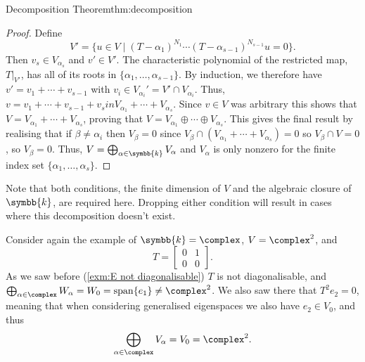 \documentclass[fleqn]{NotesClass}
\renewcommand{\field}{\symbb{k}}
\DeclareMathOperator{\Span}{span}
\begin{document}
\begin{thm}{Decomposition Theorem}{thm:decomposition}
\begin{proof}
            Define
            \begin{equation}
                V' = \{u \in V \mid (T - \alpha_1)^{N_1} \dotsm (T - \alpha_{s-1})^{N_{s-1}}u = 0\}.
            \end{equation}
            Then \(v_s \in V_{\alpha_s}\) and \(v' \in V'\).
            The characteristic polynomial of the restricted map, \(T|_{V'}\), has all of its roots in \(\{\alpha_1, \dotsc, \alpha_{s-1}\}\).
            By induction, we therefore have \(v' = v_1 + \dotsb + v_{s-1}\) with \(v_i \in V_{\alpha_i}' = V' \cap V_{\alpha_i}\).
            Thus, \(v = v_1 + \dotsb + v_{s-1} + v_s in V_{\alpha_1} + \dotsb + V_{\alpha_s}\).
            Since \(v \in V\) was arbitrary this shows that \(V = V_{\alpha_1} + \dotsb + V_{\alpha_s}\), proving that \(V = V_{\alpha_1} \oplus \dotsb \oplus V_{\alpha_s}\).
            This gives the final result by realising that if \(\beta \ne \alpha_i\) then \(V_\beta = 0\) since \(V_\beta \cap (V_{\alpha_1} + \dotsb + V_{\alpha_s}) = 0\) so \(V_\beta \cap V = 0\), so \(V_\beta = 0\).
            Thus, \(V = \bigoplus_{\alpha \in \field} V_{\alpha}\) and \(V_{\alpha}\) is only nonzero for the finite index set \(\{\alpha_1, \dotsc, \alpha_s\}\).
        \end{proof}
    \end{thm}
    
    Note that both conditions, the finite dimension of \(V\) and the algebraic closure of \(\field\), are required here.
    Dropping either condition will result in cases where this decomposition doesn't exist.
    
    \begin{exm}{}{}
        Consider again the example of \(\field = \complex\), \(V = \complex^2\), and
        \begin{equation}
            T = 
            \begin{bmatrix}
                0 & 1\\
                0 & 0
            \end{bmatrix}
            .
        \end{equation}
        As we saw before (\cref{exm:E not diagonalisable}) \(T\) is not diagonalisable, and \(\bigoplus_{\alpha \in \complex} W_\alpha = W_0 = \Span\{e_1\} \ne \complex^2\).
        We also saw there that \(T^2e_2 = 0\), meaning that when considering generalised eigenspaces we also have \(e_2 \in V_0\), and thus
        \begin{equation}
            \bigoplus_{\alpha \in \complex} V_\alpha = V_0 = \complex^2.
        \end{equation}
    \end{exm}
    
\end{document}
